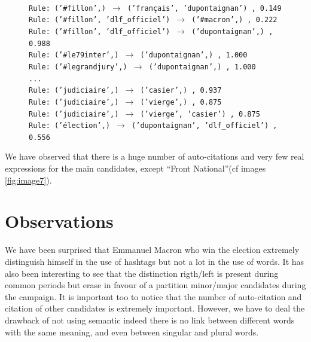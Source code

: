\documentclass[a4paper]{article}
\theoremstyle{definition}
\begin{document}
\begin{figure}
\begingroup
\fontsize{9pt}{12pt}
\texttt{\\
Rule: ('\#fillon',) $\to$ ('français', 'dupontaignan') , 0.149\\
Rule: ('\#fillon', 'dlf\_officiel') $\to$ ('\#macron',) , 0.222\\
Rule: ('\#fillon', 'dlf\_officiel') $\to$ ('dupontaignan',) , 0.988\\
Rule: ('\#le79inter',) $\to$ ('dupontaignan',) , 1.000\\
Rule: ('\#legrandjury',) $\to$ ('dupontaignan',) , 1.000\\
...\\
Rule: ('judiciaire',) $\to$ ('casier',) , 0.937\\
Rule: ('judiciaire',) $\to$ ('vierge',) , 0.875\\
Rule: ('judiciaire',) $\to$ ('vierge', 'casier') , 0.875\\
Rule: ('élection',) $\to$ ('dupontaignan', 'dlf\_officiel') , 0.556\\
}
\endgroup
{}
\end{figure}

We have observed that there is a huge number of auto-citations and very few real expressions for the main candidates, except ``Front National''(cf images \ref{fig:image7}).


\section{Observations}
We have been surprised that Emmanuel Macron who win the election extremely distinguish himself in the use of hashtags but not a lot in the use of words.
It has also been interesting to see that the distinction rigth/left is present during common periods but erase in favour of a partition minor/major candidates during the campaign.
It is important too to notice that the number of auto-citation and citation of other candidates is extremely important.
However, we have to deal the drawback of not using semantic indeed there is no link between different words with the same meaning, and even between singular and plural words.
\end{document}
